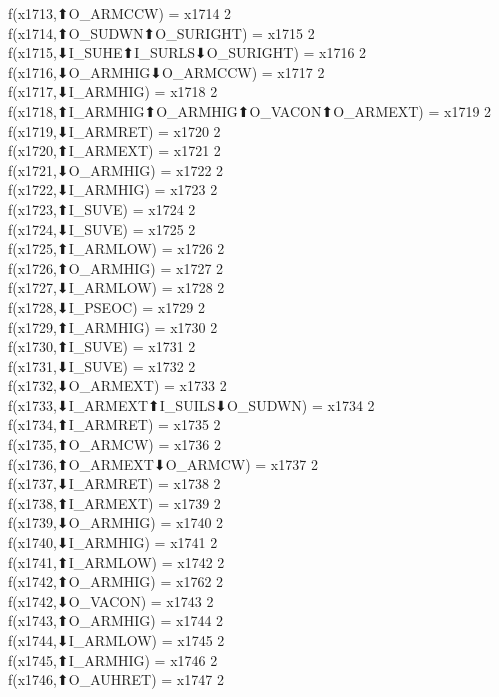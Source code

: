 f(x1713,⬆O_ARMCCW) = x1714 {2} \\
f(x1714,⬆O_SUDWN⬆O_SURIGHT) = x1715 {2} \\
f(x1715,⬇I_SUHE⬆I_SURLS⬇O_SURIGHT) = x1716 {2} \\
f(x1716,⬇O_ARMHIG⬇O_ARMCCW) = x1717 {2} \\
f(x1717,⬇I_ARMHIG) = x1718 {2} \\
f(x1718,⬆I_ARMHIG⬆O_ARMHIG⬆O_VACON⬆O_ARMEXT) = x1719 {2} \\
f(x1719,⬇I_ARMRET) = x1720 {2} \\
f(x1720,⬆I_ARMEXT) = x1721 {2} \\
f(x1721,⬇O_ARMHIG) = x1722 {2} \\
f(x1722,⬇I_ARMHIG) = x1723 {2} \\
f(x1723,⬆I_SUVE) = x1724 {2} \\
f(x1724,⬇I_SUVE) = x1725 {2} \\
f(x1725,⬆I_ARMLOW) = x1726 {2} \\
f(x1726,⬆O_ARMHIG) = x1727 {2} \\
f(x1727,⬇I_ARMLOW) = x1728 {2} \\
f(x1728,⬇I_PSEOC) = x1729 {2} \\
f(x1729,⬆I_ARMHIG) = x1730 {2} \\
f(x1730,⬆I_SUVE) = x1731 {2} \\
f(x1731,⬇I_SUVE) = x1732 {2} \\
f(x1732,⬇O_ARMEXT) = x1733 {2} \\
f(x1733,⬇I_ARMEXT⬆I_SUILS⬇O_SUDWN) = x1734 {2} \\
f(x1734,⬆I_ARMRET) = x1735 {2} \\
f(x1735,⬆O_ARMCW) = x1736 {2} \\
f(x1736,⬆O_ARMEXT⬇O_ARMCW) = x1737 {2} \\
f(x1737,⬇I_ARMRET) = x1738 {2} \\
f(x1738,⬆I_ARMEXT) = x1739 {2} \\
f(x1739,⬇O_ARMHIG) = x1740 {2} \\
f(x1740,⬇I_ARMHIG) = x1741 {2} \\
f(x1741,⬆I_ARMLOW) = x1742 {2} \\
f(x1742,⬆O_ARMHIG) = x1762 {2} \\
f(x1742,⬇O_VACON) = x1743 {2} \\
f(x1743,⬆O_ARMHIG) = x1744 {2} \\
f(x1744,⬇I_ARMLOW) = x1745 {2} \\
f(x1745,⬆I_ARMHIG) = x1746 {2} \\
f(x1746,⬆O_AUHRET) = x1747 {2} \\
